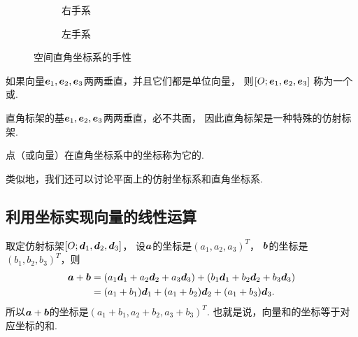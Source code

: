 \begin{figure}[htb]
	\centering
	\def\subwidth{.4\linewidth}
	\begin{subfigure}[b]{\subwidth}
		\centering
		\caption{右手系}
		\label{figure:解析几何.右手系}
	\end{subfigure}
	\begin{subfigure}[b]{\subwidth}
		\centering
		\caption{左手系}
		\label{figure:解析几何.左手系}
	\end{subfigure}
	\caption{空间直角坐标系的手性}
\end{figure}

\begin{definition}
如果向量\(\boldsymbol{e}_1,\boldsymbol{e}_2,\boldsymbol{e}_3\)两两垂直，并且它们都是单位向量，
则\([O;\boldsymbol{e}_1,\boldsymbol{e}_2,\boldsymbol{e}_3]\)
称为一个或.
\end{definition}

直角标架的基\(\boldsymbol{e}_1,\boldsymbol{e}_2,\boldsymbol{e}_3\)两两垂直，必不共面，
因此直角标架是一种特殊的仿射标架.

点（或向量）在直角坐标系中的坐标称为它的.

类似地，我们还可以讨论平面上的仿射坐标系和直角坐标系.

\subsection{利用坐标实现向量的线性运算}
取定仿射标架\([O;\boldsymbol{d}_1,\boldsymbol{d}_2,\boldsymbol{d}_3]\)，
设\(\boldsymbol{a}\)的坐标是\((a_1,a_2,a_3)^T\)，
\(\boldsymbol{b}\)的坐标是\((b_1,b_2,b_3)^T\)，则\begin{align*}
\boldsymbol{a}+\boldsymbol{b}
&= (a_1 \boldsymbol{d}_1 + a_2 \boldsymbol{d}_2 + a_3 \boldsymbol{d}_3)
+ (b_1 \boldsymbol{d}_1 + b_2 \boldsymbol{d}_2 + b_3 \boldsymbol{d}_3) \\
&= (a_1 + b_1) \boldsymbol{d}_1 + (a_1 + b_2) \boldsymbol{d}_2 + (a_1 + b_3) \boldsymbol{d}_3.
\end{align*}
所以\(\boldsymbol{a}+\boldsymbol{b}\)的坐标是\((a_1+b_1,a_2+b_2,a_3+b_3)^T\).
也就是说，向量和的坐标等于对应坐标的和.

